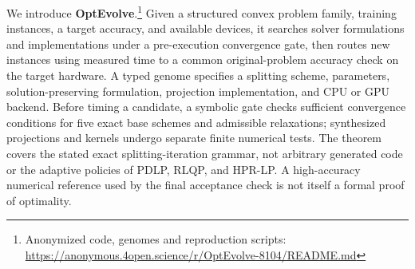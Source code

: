 We introduce \textbf{OptEvolve}.\footnote{Anonymized code, genomes and reproduction scripts: \url{https://anonymous.4open.science/r/OptEvolve-8104/README.md}} Given a structured convex problem family, training instances, a target accuracy, and available devices, it searches solver formulations and implementations under a pre-execution convergence gate, then routes new instances using measured time to a common original-problem accuracy check on the target hardware. A typed genome specifies a splitting scheme, parameters, solution-preserving formulation, projection implementation, and CPU or GPU backend. Before timing a candidate, a symbolic gate checks sufficient convergence conditions for five exact base schemes and admissible relaxations; synthesized projections and kernels undergo separate finite numerical tests. The theorem covers the stated exact splitting-iteration grammar, not arbitrary generated code or the adaptive policies of PDLP, RLQP, and HPR-LP. A high-accuracy numerical reference used by the final acceptance check is not itself a formal proof of optimality.


